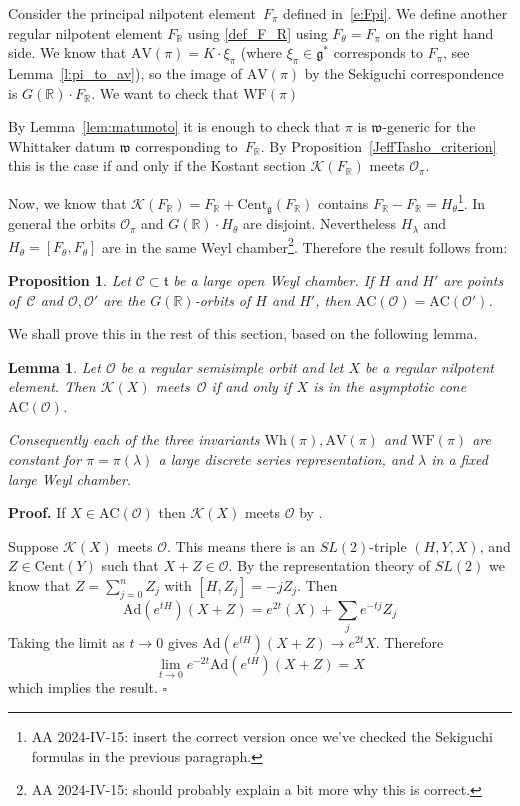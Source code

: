 \documentclass[10pt,leqno]{article}
\newtheorem{lemma}[equation]{Lemma}
\newtheorem{proposition}[equation]{Proposition}
\newcommand{\qed}{\hfill $\square$ \medskip}
\newenvironment{proof}[1][Proof]{\noindent\textbf{#1.} }{\qed}
\newcommand{\Ad}{\mathrm{Ad}}
\newcommand{\Cent}{\mathrm{Cent}}
\renewcommand{\O}{\mathcal O}
\newcommand{\R}{\mathbb R}
\renewcommand{\t}{\mathfrak t}
\newcommand{\g}{\mathfrak g}
\newcommand{\w}{\mathfrak w}
\newcommand{\AV}{\mathrm{AV}}
\newcommand{\Wh}{\mathrm{Wh}}
\newcommand{\WF}{\mathrm{WF}}
\newcommand{\AC}{\mathrm{AC}}
\newcommand{\Kostant}[1]{\mathcal{K}(#1)}
\begin{document}
Consider the principal nilpotent element~$F_\pi$ defined in~\eqref{e:Fpi}. We define another regular nilpotent element  $F_\R$ using 
\eqref{def_F_R} using $F_\theta=F_\pi$ on the right hand side. 
We know that  $\AV(\pi)=K \cdot \xi_\pi$ (where $\xi_\pi\in\g^*$ corresponds to $F_\pi$, see Lemma~\ref{l:pi_to_av}), so the image of $\AV(\pi)$ by the Sekiguchi correspondence is 
 $G(\R)\cdot F_\R$. We want to check that $\WF(\pi)$ 

By Lemma~\ref{lem:matumoto} it is enough to check that $\pi$ is $\w$-generic for the Whittaker datum $\w$ corresponding to~$F_\R$. By Proposition~\ref{JeffTasho_criterion} this is the case if and only if the Kostant section $\Kostant{F_\R}$ meets $\mathcal{O}_\pi$. 

Now, we know that $\Kostant{F_\R}=F_\R+\mathrm{Cent}_\g(F_\R)$ contains $F_\R-F_\R = H_\theta$\footnote{AA 2024-IV-15: insert the correct version once we've checked the Sekiguchi formulas in the previous paragraph. }.
In general the orbits $\mathcal{O}_\pi$ and $G(\R) \cdot H_\theta$ are disjoint. 
Nevertheless $H_{\lambda}$ and $H_\theta=[F_\theta, F_\theta]$ are in the same Weyl chamber\footnote{AA 2024-IV-15: should probably explain a bit more why this is correct.}.
Therefore the result follows from:  

\begin{proposition}\label{prop:AC_chamber} Let $\mathcal{C} \subset \t$ be a large open Weyl chamber.
If $H$ and $H'$ are  points of~$\mathcal{C}$ and $\mathcal{O}, \mathcal{O}'$ are the   $G(\R)$-orbits of $H$ and $H'$, then $\AC(\mathcal{O})=\AC(\mathcal{O}')$.
\end{proposition}

We shall prove this in the rest of this section, based on the following lemma.

\begin{lemma}\label{lem:Kost_and_AC} Let $\mathcal{O}$ be a regular semisimple orbit and  let $X$ be a regular nilpotent element. Then $\Kostant{X}$ meets~$\mathcal{O}$ if and only if $X$ is in the asymptotic cone~$\AC(\mathcal{O})$. 

Consequently each of the three invariants $\Wh(\pi),\AV(\pi)$ and $\WF(\pi)$ are constant for $\pi=\pi(\lambda)$ a large discrete series representation, and $\lambda$ in a fixed large Weyl chamber.
\end{lemma}
\begin{proof} 
If $X\in \AC(\mathcal O)$ then $\Kostant{X}$ meets $\mathcal O$ by \cite[Lemma 3.2.3]{adams_kaletha}.

Suppose $\Kostant{X}$ meets $\mathcal O$.
This means there is an $SL(2)$-triple $(H,Y,X)$, and $Z\in \Cent(Y)$ such that $X+Z\in \O$. 
By the representation theory of $SL(2)$ we know that $Z=\sum_{j=0}^n Z_j$ with $[H,Z_j]=-jZ_j$. 
Then 
$$
\Ad(e^{tH})(X+Z)=e^{2t}(X) + \sum_j e^{-tj}Z_j
$$
Taking the limit as $t\rightarrow 0$ gives $\Ad(e^{tH})(X+Z)\rightarrow e^{2t}X$. Therefore
$$
\lim_{t\rightarrow 0}e^{-2t}\Ad(e^{tH})(X+Z)=X
$$ which implies the result.
\end{proof}
\end{document}
